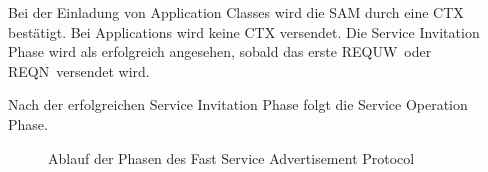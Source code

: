 Bei der Einladung von Application Classes wird die \ac{SAM} durch eine \ac{CTX} bestätigt. Bei Applications wird keine \ac{CTX} versendet. Die Service Invitation Phase wird als erfolgreich angesehen, sobald das erste \glqq REQUW\grqq~oder \glqq REQN\grqq~versendet wird. 

Nach der erfolgreichen Service Invitation Phase folgt die Service Operation Phase. 
\begin{figure} 
  \centering 
   \qquad 
  \caption{Ablauf der Phasen des Fast Service Advertisement Protocol \cite{iso24102-5}} 
  \label{fig:architektur_ablaufPhasen}
\end{figure}

